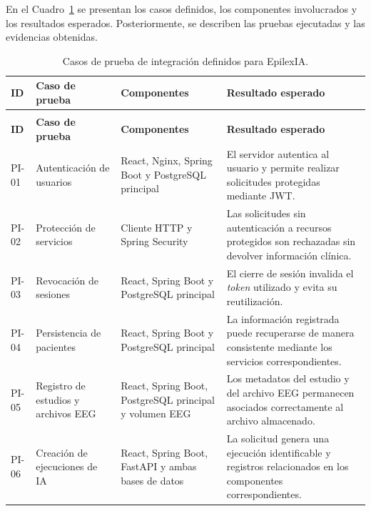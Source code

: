 En el Cuadro~\ref{tab:casos_pruebas_integracion} se presentan los casos definidos, los componentes involucrados y los resultados esperados. Posteriormente, se describen las pruebas ejecutadas y las evidencias obtenidas.


\begin{longtable}{|
>{\raggedright\arraybackslash}p{1.1cm}|
>{\raggedright\arraybackslash}p{3.5cm}|
>{\raggedright\arraybackslash}p{3.5cm}|
>{\raggedright\arraybackslash}p{5.0cm}|}
\caption{Casos de prueba de integración definidos para EpilexIA.}
\label{tab:casos_pruebas_integracion}\\
\hline
\textbf{ID} &
\textbf{Caso de prueba} &
\textbf{Componentes} &
\textbf{Resultado esperado} \\
\hline
\endfirsthead

\multicolumn{4}{c}{\textit{Continuación del Cuadro~\thetable}}\\
\hline
\textbf{ID} &
\textbf{Caso de prueba} &
\textbf{Componentes} &
\textbf{Resultado esperado} \\
\hline
\endhead

PI-01 &
Autenticación de usuarios &
React, Nginx, Spring Boot y PostgreSQL principal &
El servidor autentica al usuario y permite realizar solicitudes protegidas mediante JWT. \\
\hline

PI-02 &
Protección de servicios &
Cliente HTTP y Spring Security &
Las solicitudes sin autenticación a recursos protegidos son rechazadas sin devolver información clínica. \\
\hline

PI-03 &
Revocación de sesiones &
React, Spring Boot y PostgreSQL principal &
El cierre de sesión invalida el \textit{token} utilizado y evita su reutilización. \\
\hline

PI-04 &
Persistencia de pacientes &
React, Spring Boot y PostgreSQL principal &
La información registrada puede recuperarse de manera consistente mediante los servicios correspondientes. \\
\hline

PI-05 &
Registro de estudios y archivos EEG &
React, Spring Boot, PostgreSQL principal y volumen EEG &
Los metadatos del estudio y del archivo EEG permanecen asociados correctamente al archivo almacenado. \\
\hline

PI-06 &
Creación de ejecuciones de IA &
React, Spring Boot, FastAPI y ambas bases de datos &
La solicitud genera una ejecución identificable y registros relacionados en los componentes correspondientes. \\
\hline


\end{longtable}
